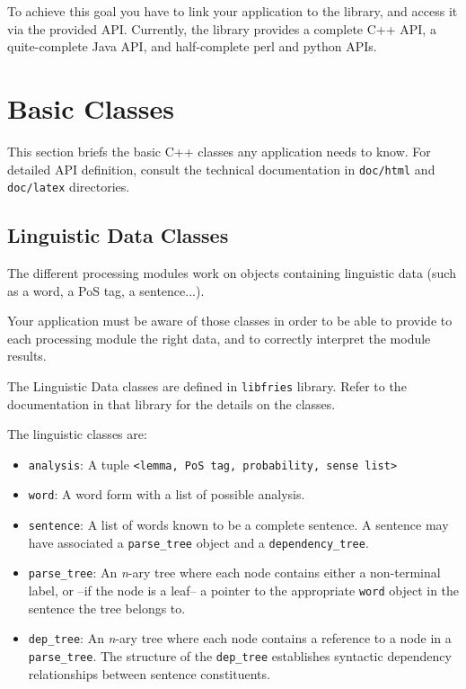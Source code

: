 \documentclass[a4paper]{book}
\begin{document}
  To achieve this goal you have to link your application to the
 library, and access it via the provided API.  Currently, the library
 provides a complete C++ API, a quite-complete Java API, and 
 half-complete perl and python APIs.

 \section{Basic Classes}

 This section briefs the basic C++ classes any application needs to
know. For detailed API definition, consult the technical documentation
in {\tt doc/html} and {\tt doc/latex} directories.

\subsection{Linguistic Data Classes}
\label{ssec-data}

  The different processing modules work on objects containing
  linguistic data (such as a word, a PoS tag, a sentence...).

   Your application must be aware of those classes in order to
  be able to provide to each processing module the right data,
  and to correctly interpret the module results.

   The Linguistic Data classes are defined in {\tt libfries} library. Refer 
  to the documentation in that library for the details on the classes.

   The linguistic classes are:
\begin{itemize}
\itemsep 0cm
\item {\tt analysis}: A tuple  \verb#<lemma, PoS tag, probability, sense list>#
\item {\tt word}:     A word form with a list of possible analysis.
\item {\tt sentence}: A list of words known to be a complete
  sentence. A sentence may have associated a {\tt parse\_tree} object and a {\tt dependency\_tree}.
\item {\tt parse\_tree}: An {\it n}-ary tree where each node contains
  either a non-terminal label, or --if the node is a leaf-- a pointer
  to the appropriate {\tt word} object in the sentence the tree
  belongs to.
\item {\tt dep\_tree}: An {\it n}-ary tree where each node contains a 
  reference to a node in a {\tt parse\_tree}. The structure of the {\tt dep\_tree}
  establishes syntactic dependency relationships between sentence constituents.
\end{itemize}
\end{document}

